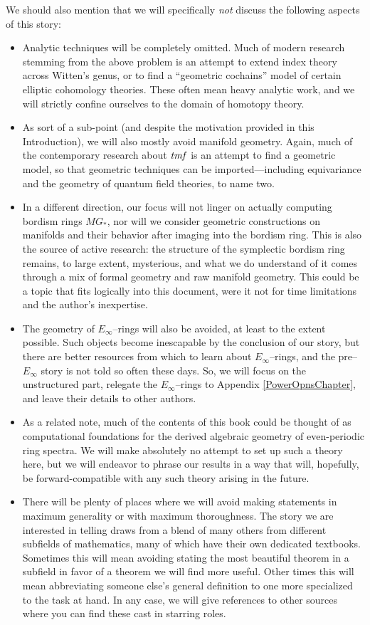 We should also mention that we will specifically \emph{not} discuss the following aspects of this story:
\begin{itemize}
\item Analytic techniques will be completely omitted.  Much of modern research stemming from the above problem is an attempt to extend index theory across Witten's genus, or to find a ``geometric cochains'' model of certain elliptic cohomology theories.  These often mean heavy analytic work, and we will strictly confine ourselves to the domain of homotopy theory.
\item As sort of a sub-point (and despite the motivation provided in this Introduction), we will also mostly avoid manifold geometry.  Again, much of the contemporary research about \(\mathit{tmf}\) is an attempt to find a geometric model, so that geometric techniques can be imported---including equivariance and the geometry of quantum field theories, to name two.
\item In a different direction, our focus will not linger on actually computing bordism rings \(MG_*\), nor will we consider geometric constructions on manifolds and their behavior after imaging into the bordism ring.  This is also the source of active research: the structure of the symplectic bordism ring remains, to large extent, mysterious, and what we do understand of it comes through a mix of formal geometry and raw manifold geometry.  This could be a topic that fits logically into this document, were it not for time limitations and the author's inexpertise.
\item The geometry of \(E_\infty\)--rings will also be avoided, at least to the extent possible.  Such objects become inescapable by the conclusion of our story, but there are better resources from which to learn about \(E_\infty\)--rings, and the pre--\(E_\infty\) story is not told so often these days.  So, we will focus on the unstructured part, relegate the \(E_\infty\)--rings to Appendix \ref{PowerOpnsChapter}, and leave their details to other authors.
\item As a related note, much of the contents of this book could be thought of as computational foundations for the derived algebraic geometry of even-periodic ring spectra.  We will make absolutely no attempt to set up such a theory here, but we will endeavor to phrase our results in a way that will, hopefully, be forward-compatible with any such theory arising in the future.
\item There will be plenty of places where we will avoid making statements in maximum generality or with maximum thoroughness.  The story we are interested in telling draws from a blend of many others from different subfields of mathematics, many of which have their own dedicated textbooks.  Sometimes this will mean avoiding stating the most beautiful theorem in a subfield in favor of a theorem we will find more useful.  Other times this will mean abbreviating someone else's general definition to one more specialized to the task at hand.  In any case, we will give references to other sources where you can find these cast in starring roles.
\end{itemize}

